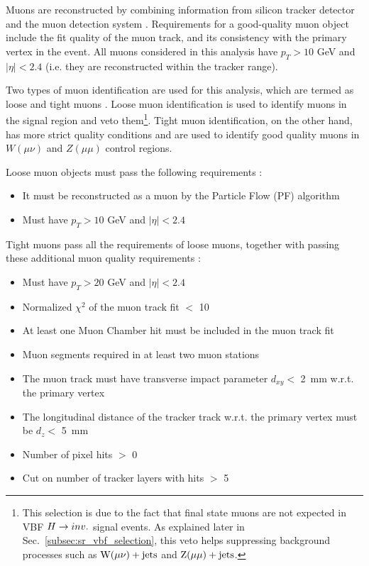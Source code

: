 Muons are reconstructed by combining information from silicon tracker detector and the muon detection system
\cite{cms:muon_paper}. Requirements for a good-quality muon object include the fit quality of the
muon track, and its consistency with the primary vertex in the event. All muons considered in this
analysis have $p_T > 10$ GeV and $|\eta| < 2.4$ (i.e. they are reconstructed within the tracker range).

Two types of muon identification are used for this analysis, which are termed as loose and tight muons \cite{CMS-MUO-TWIKI-IDLOOSE,CMS-MUO-TWIKI-IDTIGHT}.
Loose muon identification is used to identify muons in the signal region and veto them\footnote{This selection is due to the fact that
final state muons are not expected in VBF $H \rightarrow inv.$ signal events. As explained later in Sec.~\ref{subsec:sr_vbf_selection}, this veto
helps suppressing background processes such as $\mathrm{W}(\mu\nu)+\textrm{jets}$ and $\mathrm{Z}(\mu\mu)+\textrm{jets}$.}. 
Tight muon identification, on the other hand,
has more strict quality conditions and are used to identify good quality muons in $W(\mu \nu)$ and $Z(\mu \mu)$ control regions.

Loose muon objects must pass the following requirements \cite{CMS-MUO-TWIKI-IDLOOSE}:

\begin{itemize}
    \item It must be reconstructed as a muon by the Particle Flow (PF) algorithm
    \item Must have $p_T > 10$ GeV and $|\eta| < 2.4$
\end{itemize}

Tight muons pass all the requirements of loose muons, together with passing these additional muon quality requirements \cite{CMS-MUO-TWIKI-IDTIGHT}:

\begin{itemize}
    \item Must have $p_T > 20$ GeV and $|\eta| < 2.4$
    \item Normalized $\chi^2$ of the muon track fit $<$ 10
    \item At least one Muon Chamber hit must be included in the muon track fit
    \item Muon segments required in at least two muon stations
    \item The muon track must have transverse impact parameter $d_{xy} < $ 2~mm w.r.t. the primary vertex
    \item The longitudinal distance of the tracker track w.r.t. the primary vertex must be $d_z < $ 5~mm
    \item Number of pixel hits $>$ 0
    \item Cut on number of tracker layers with hits $>$ 5
\end{itemize}

